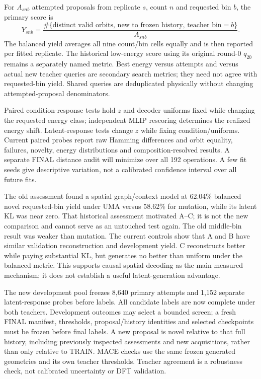 \documentclass[10pt]{article}
\begin{document}
For $A_{snb}$ attempted proposals from replicate $s$, count $n$ and requested bin
$b$, the primary score is
\begin{equation}
Y_{snb}=\frac{\#\{\text{distinct valid orbits, new to frozen history, teacher bin}=b\}}
{A_{snb}}.
\end{equation}
The balanced yield averages all nine count/bin cells equally and is then
reported per fitted replicate. The historical low-energy score using its original
round-0 $q_{20}$ remains a separately named metric. Best energy versus attempts
and versus actual new teacher queries are secondary search metrics; they need
not agree with requested-bin yield. Shared queries are deduplicated physically
without changing attempted-proposal denominators.

Paired condition-response tests hold $z$ and decoder uniforms fixed while changing
the requested energy class; independent MLIP rescoring determines the realized
energy shift. Latent-response tests change $z$ while fixing condition/uniforms.
Current paired probes report raw Hamming differences and orbit equality, failures,
novelty, energy distributions and composition-resolved results. A separate FINAL
distance audit will minimize over all 192 operations. A few fit seeds give
descriptive variation, not a calibrated confidence interval over all future fits.



The old assessment found a spatial graph/context model at 62.04\% balanced novel
requested-bin yield under UMA versus 58.62\% for mutation, while its latent KL
was near zero. That historical assessment motivated A--C; it is not the new
comparison and cannot serve as an untouched test again. The old middle-bin
result was weaker than mutation. The current controls show that A and B have
similar validation reconstruction and development yield. C reconstructs better
while paying substantial KL, but generates no better than uniform under the
balanced metric. This supports causal spatial decoding as the main measured
mechanism; it does not establish a useful latent-generation advantage.

The new development pool freezes 8,640 primary attempts and 1,152 separate
latent-response probes before labels. All candidate labels are now complete under
both teachers. Development outcomes may select a bounded
screen; a fresh FINAL manifest, thresholds, proposal/history identities and
selected checkpoints must be frozen before final labels. A new proposal is novel
relative to that full history, including previously inspected assessments and
new acquisitions, rather than only relative to TRAIN. MACE checks use the same
frozen generated geometries and its own teacher thresholds. Teacher agreement
is a robustness check, not calibrated uncertainty or DFT validation.
\newpage
\end{document}
